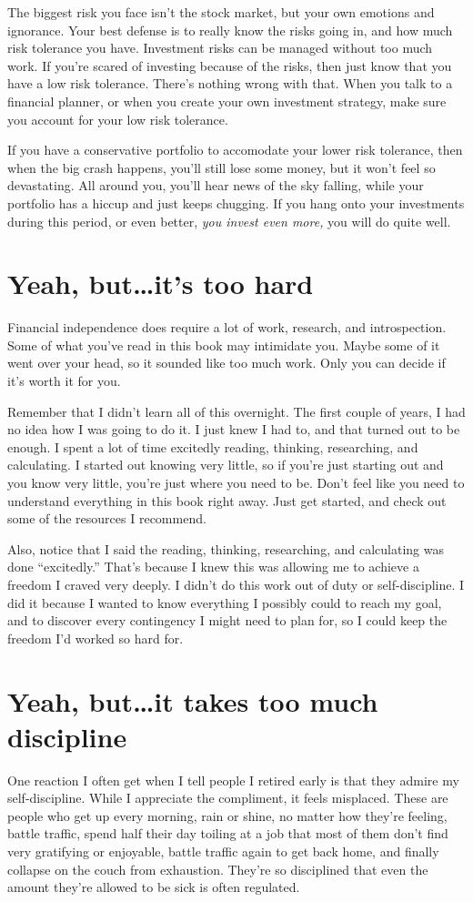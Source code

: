 The biggest risk you face isn't the stock market, but your own emotions and ignorance. Your best defense is to really know the risks going in, and how much risk tolerance you have. Investment risks can be managed without too much work. If you're scared of investing because of the risks, then just know that you have a low risk tolerance. There's nothing wrong with that. When you talk to a financial planner, or when you create your own investment strategy, make sure you account for your low risk tolerance.

If you have a conservative portfolio to accomodate your lower risk tolerance, then when the big crash happens, you'll still lose some money, but it won't feel so devastating. All around you, you'll hear news of the sky falling, while your portfolio has a hiccup and just keeps chugging. If you hang onto your investments during this period, or even better, \emph{you invest even more,} you will do quite well.

\section{Yeah, but\ldots it's too hard}
Financial independence does require a lot of work, research, and introspection. Some of what you've read in this book may intimidate you. Maybe some of it went over your head, so it sounded like too much work. Only you can decide if it's worth it for you.

Remember that I didn't learn all of this overnight. The first couple of years, I had no idea how I was going to do it. I just knew I had to, and that turned out to be enough. I spent a lot of time excitedly reading, thinking, researching, and calculating. I started out knowing very little, so if you're just starting out and you know very little, you're just where you need to be. Don't feel like you need to understand everything in this book right away. Just get started, and check out some of the resources I recommend.

Also, notice that I said the reading, thinking, researching, and calculating was done ``excitedly.'' That's because I knew this was allowing me to achieve a freedom I craved very deeply. I didn't do this work out of duty or self-discipline. I did it because I wanted to know everything I possibly could to reach my goal, and to discover every contingency I might need to plan for, so I could keep the freedom I'd worked so hard for.

\section{Yeah, but\ldots it takes too much discipline}
One reaction I often get when I tell people I retired early is that they admire my self-discipline. While I appreciate the compliment, it feels misplaced. These are people who get up every morning, rain or shine, no matter how they're feeling, battle traffic, spend half their day toiling at a job that most of them don't find very gratifying or enjoyable, battle traffic again to get back home, and finally collapse on the couch from exhaustion. They're so disciplined that even the amount they're allowed to be sick is often regulated.


